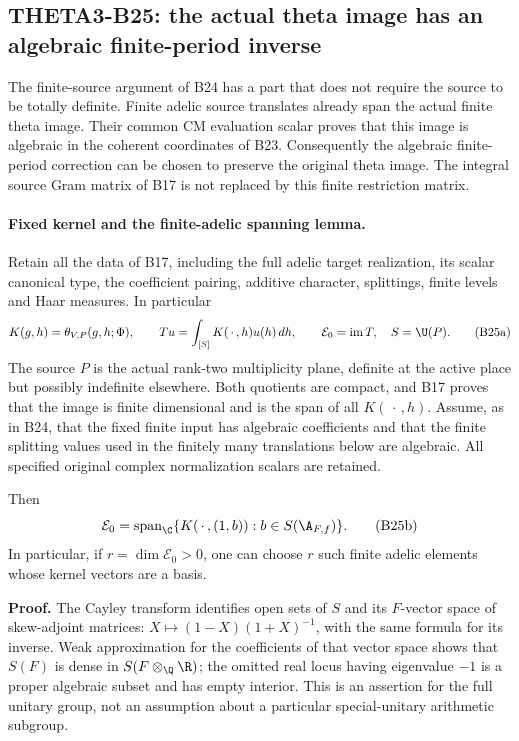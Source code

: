 \subsection{THETA3-B25: the actual theta image has an algebraic finite-period inverse}\label{B25}

The finite-source argument of B24 has a part that does not
require the source to be totally definite.  Finite adelic
source translates already span the actual finite theta
image.  Their common CM evaluation scalar proves that
this image is algebraic in the coherent coordinates of
B23.  Consequently the algebraic finite-period correction
can be chosen to preserve the original theta image.
The integral source Gram matrix of B17 is not replaced
by this finite restriction matrix.

\paragraph{Fixed kernel and the finite-adelic spanning lemma.}
Retain all the data of B17, including the full adelic
target realization, its scalar canonical type, the
coefficient pairing, additive character, splittings,
finite levels and Haar measures.  In particular
\[
 K(g,h)=\theta_{V,P}(g,h;\Phi),\qquad
 Tu=\int_{[S]}K(\,\cdot\,,h)u(h)\,dh,
 \qquad \mathcal E_0=\operatorname{im}T,
 \quad S=\U(P).
 \tag{B25a}
\]
The source $P$ is the actual rank-two multiplicity
plane, definite at the active place but possibly
indefinite elsewhere.  Both quotients are compact,
and B17 proves that the image is finite dimensional
and is the span of all $K(\,\cdot\,,h)$.
Assume, as in B24, that the fixed finite input has
algebraic coefficients and that the finite splitting
values used in the finitely many translations below
are algebraic.  All specified original complex
normalization scalars are retained.

Then
\[
 \mathcal E_0=
  \operatorname{span}_{\C}
       \{K(\,\cdot\,,(1,b)):b\in S(\A_{F,f})\}.
 \tag{B25b}
\]
In particular, if $r=\dim\mathcal E_0>0$, one can
choose $r$ such finite adelic elements whose kernel
vectors are a basis.

\textbf{Proof.}
The Cayley transform identifies open sets of $S$
and its $F$-vector space of skew-adjoint matrices:
$X\mapsto(1-X)(1+X)^{-1}$, with the same formula
for its inverse.  Weak approximation for the
coefficients of that vector space shows that
$S(F)$ is dense in $S(F\otimes_\Q\R)$; the omitted
real locus having eigenvalue $-1$ is a proper
algebraic subset and has empty interior.  This is
an assertion for the full unitary group, not an
assumption about a particular special-unitary
arithmetic subgroup.

